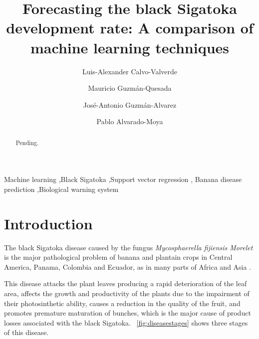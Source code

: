 \documentclass[review]{elsarticle}
\begin{document}
\begin{frontmatter}

\title{Forecasting the black Sigatoka development rate: A comparison of machine learning techniques 
}

\author[afiLuisAlex]{Luis-Alexander Calvo-Valverde}

\author[afiCorbana] {Mauricio Guzmán-Quesada}
\author[afiCorbana]{José-Antonio Guzmán-Alvarez}
\author[afiPablo]{Pablo Alvarado-Moya}

\address[afiLuisAlex]{DOCINADE, Instituto Tecnológico de Costa Rica, 
Computer Research Center, Multidisciplinar program eScience, Cartago, Costa Rica}

\address[afiCorbana]{Dirección de Investigaciones, Corporación Bananera Nacional S.A., Guápiles, Costa Rica}

\address[afiPablo]{DOCINADE, Instituto Tecnológico de Costa Rica, Cartago, Costa Rica}

\begin{abstract}
Pending.
\end{abstract}

\begin{keyword}
Machine learning \sep Black Sigatoka \sep Support vector regression \sep
Banana disease prediction \sep Biological warning system 
\end{keyword}

\end{frontmatter}

\linenumbers

\section{Introduction}


The black Sigatoka disease caused by the fungus \emph{Mycosphaerella
  fijiensis Morelet} is the major pathological problem of banana and
plantain crops in Central America, Panama, Colombia and Ecuador, as in
many parts of Africa and Asia \citep{MarinVargas1995}.

This disease attacks the plant leaves producing a rapid deterioration
of the leaf area, affects the growth and productivity of the plants
due to the impairment of their photosinthetic ability, causes a
reduction in the quality of the fruit, and promotes premature
maturation  of bunches, which is
the major cause of product losses associated with the black
Sigatoka. \figurename~\ref{fig:diseasestages} shows three stages of
this disease.
\end{document}
